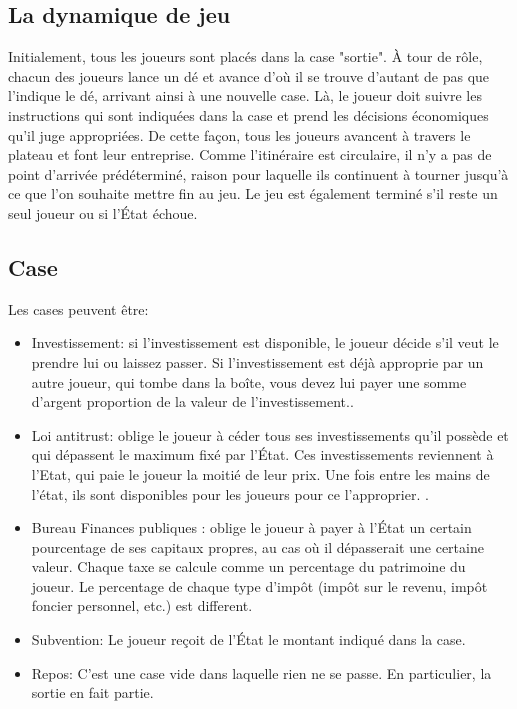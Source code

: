 \documentclass[12pt]{article}
\begin{document}
    \subsection{La dynamique de jeu}
    Initialement, tous les joueurs sont placés dans la case "sortie". À tour de rôle, chacun
    des joueurs lance un dé et avance d'où il se trouve d'autant de pas que l'indique le
    dé, arrivant ainsi à une nouvelle case. Là, le joueur doit suivre les instructions
    qui sont indiquées dans la case et prend les décisions économiques qu'il juge appropriées.
    De cette façon, tous les joueurs avancent à travers le plateau et font leur
    entreprise. Comme l'itinéraire est circulaire, il n'y a pas de point d'arrivée prédéterminé,
    raison pour laquelle ils continuent à tourner jusqu'à ce que l'on souhaite mettre fin au jeu.
    Le jeu est également terminé s'il reste un seul joueur ou si l'État échoue.
    
    \subsection{Case}
    Les cases peuvent être:
    \begin{itemize}
        \item Investissement: si l'investissement est disponible, 
        	le joueur décide s'il veut le prendre lui ou laissez passer. 
	Si l'investissement est déjà approprie par un autre joueur, qui tombe dans la boîte, 
	vous devez lui payer une somme d'argent proportion de la valeur de l'investissement..
    
        \item Loi antitrust: oblige le joueur à céder tous ses investissements
    qu'il possède et qui dépassent le maximum fixé par l'État. 
    Ces investissements reviennent à l'Etat, qui paie le joueur la moitié de leur prix. 
    Une fois entre les mains de l'état, ils sont disponibles pour les joueurs pour ce l'approprier. 
    .
        \item  Bureau Finances publiques : oblige le joueur à payer à l'État un certain pourcentage de ses
    capitaux propres, au cas où il dépasserait une certaine valeur. Chaque taxe se calcule comme un percentage du patrimoine du joueur.
    Le percentage de chaque type d'impôt (impôt sur le revenu, impôt foncier personnel, etc.) est different. 
        \item Subvention: Le joueur reçoit de l'État le montant indiqué dans la case.
        \item Repos: C'est une case vide dans laquelle rien ne se passe. En particulier, la sortie
    en fait partie.
    \end{itemize}
\end{document}
